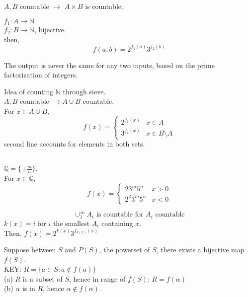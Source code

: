 \documentclass[12pt]{article}
\begin{document}
$A, B$ countable $\rightarrow$ $A \times B$ is countable. 
\textcolor[gray]{0.5}{
$f_1: A \rightarrow \mathbb{N}$\\
$f_2: B \rightarrow \mathbb{N}$, bijective. \\
then, 
$$f(a, b) = 2^{f_1(a)} 3^{f_2(b)}$$

The output is never the same for any two inputs, based on the prime factorization of integers.

Idea of counting $\mathbb{N}$ through sieve.\\

$A, B$ countable $\rightarrow A \cup B$ countable.\\
\textcolor[gray]{0.5}{For $x \in A \cup B$, 
\begin{displaymath}
   f(x) = \left\{
     \begin{array}{lr}
       2^{f_1(x)} & x \in A\\
       3^{f_2(x)} & x \in B \setminus A
     \end{array}
   \right.
\end{displaymath}
second line accounts for elements in both sets.\\
}

 \\
\textcolor[gray]{0.5}{$\mathbb{Q} = \{\pm \frac{m}{n}\}.$\\
For $x \in \mathbb{Q}$,
\begin{displaymath}
   f(x) = \left\{
     \begin{array}{lr}
       2 3^{m} 5^n & x > 0 \\
       2^2 3^m 5^n & x < 0
     \end{array}
   \right.
\end{displaymath}
}

$$\cup_1^\infty A_i \text{ is countable for } A_i \text{ countable}$$
\textcolor[gray]{0.5}{$k(x) = i$ for $i$ the smallest $A_i$ containing $x$. \\
Then, $f(x) = 2^{k(x)}3^{f_{k(x)}(x)}$
}


\textcolor[gray]{0.5}{Suppose between $S$ and $P(S)$, the powerset of $S$, there exists a bijective map $f(S)$.\\
KEY: $R = \{ a \in S : a \not \in f(a)\}$\\
(a) $R$ is a subset of $S$, hence  in range of $f(S)$: $R = f(\alpha)$ \\
(b) $\alpha$ is in $R$, hence $\alpha \not \in f(\alpha)$.\\
}

}
\end{document}
